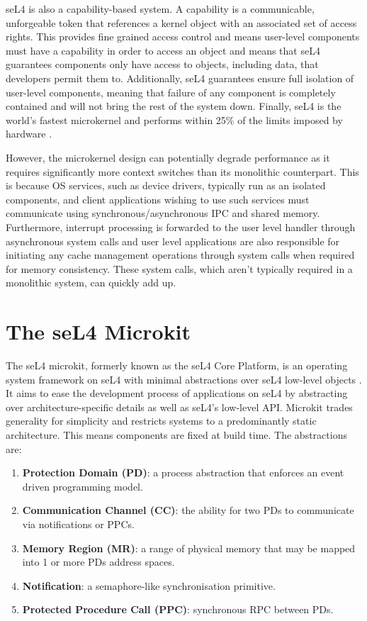 seL4 is also a capability-based system. A capability is a communicable, unforgeable token that 
references a kernel object with an associated set of access rights. This provides fine grained access control
and means user-level components must have a capability in order to access an object and means that seL4
guarantees components only have access to objects, including data, that developers permit them to.
Additionally, seL4 guarantees ensure full isolation of user-level components, meaning that
failure of any component is completely contained and will not bring the rest of the system down. 
Finally, seL4 is the world's fastest microkernel and performs within 25\%
of the limits imposed by hardware \cite{Mi_LYWC_19}. 

However, the microkernel design can potentially degrade performance as it requires
significantly more context switches than its monolithic counterpart. This is because OS services,
such as device drivers, typically run as an isolated components, and client
applications wishing to use such services must communicate using synchronous/asynchronous
IPC and shared memory. Furthermore, interrupt processing is forwarded to the user level handler
through asynchronous system calls and user level applications are also responsible for initiating
any cache management operations through system calls when required
for memory consistency. These system calls, which aren't typically required in a monolithic
system, can quickly add up. 

\section{The seL4 Microkit}
The seL4 microkit, formerly known as the seL4 Core Platform,
is an operating system framework on seL4 with minimal abstractions over seL4 low-level
objects \cite{Heiser_PCVL_22}. It aims to ease the development process of applications on seL4 by abstracting over
architecture-specific details as well as seL4's low-level API. Microkit trades generality for simplicity and 
restricts systems to a predominantly static architecture. This means components are fixed at build time. 
The abstractions are:
\begin{enumerate}
    \item \textbf{Protection Domain (PD)}: a process abstraction that enforces an event driven programming model.
    \item \textbf{Communication Channel (CC)}: the ability for two PDs to communicate via notifications or PPCs.
    \item \textbf{Memory Region (MR)}: a range of physical memory that may be mapped into 1 or more PDs address spaces. 
    \item \textbf{Notification}: a semaphore-like synchronisation primitive. 
    \item \textbf{Protected Procedure Call (PPC)}: synchronous RPC between PDs. 
\end{enumerate}

